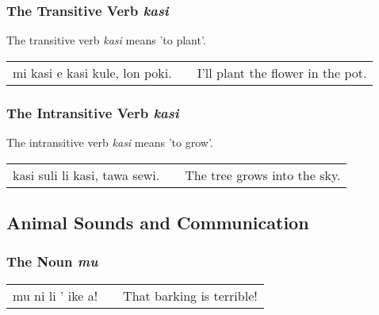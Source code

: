 \subsubsection*{The Transitive Verb \textit{kasi}}
%
%
The transitive verb \textit{kasi} means 'to plant'.

\begin{supertabular}{p{5,5cm}|ll}
mi kasi e kasi kule, lon poki. && I'll plant the flower in the pot. \\
\end{supertabular} 

%
%
\subsubsection*{The Intransitive Verb \textit{kasi}}
%
%
The intransitive verb \textit{kasi} means 'to grow'.

\begin{supertabular}{p{5,5cm}|ll}
kasi suli li kasi, tawa sewi. && The tree grows into the sky. \\
\end{supertabular}  

%
%
%
%
\subsection*{Animal Sounds and Communication}
%
%
\subsubsection*{The Noun \textit{mu}}

\begin{supertabular}{p{5,5cm}|ll}
mu ni li ' ike a! && That barking is terrible! \\
\end{supertabular} 

%
